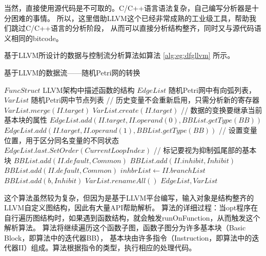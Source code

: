 当然，直接使用源代码是不可取的。C/C++语言语法复杂，自己编写分析器是十分困难的事情。
所以，这里借助LLVM这个已经非常成熟的工业级工具，帮助我们跳过C/C++语言的分析阶段，
从而可以直接分析结构整齐，同时又与源代码语义相同的bitcode。

基于LLVM所设计的数据与控制流分析算法如算法 \ref{alg:eg:dfgllvm} 所示。

\begin{algorithm}[!hbt]
\caption{基于LLVM的数据流——随机Petri网的转换} \label{alg:eg:dfgllvm}
\begin{algorithmic}[1] %
  \Require $FuncStruct$ LLVM架构中描述函数的结构
  \Ensure $EdgeList$ 随机Petri网中有向弧列表，$VarList$ 随机Petri网中节点列表
              \State // 历史变量不会重新启用，只需分析新的寄存器
              \State $VarList.merge(II.target)$
            \Else
              \State $VarList.create(II.target)$
            \EndIf
            \State // 数据的变换要继承当前基本块的属性
            \State $EdgeList.add(II.target, II.operand(0), BBList.getType(BB))$
            \State $EdgeList.add(II.target, II.operand(1), BBList.getType(BB))$
            \State // 设置变量位置，用于区分同名变量的不同状态
            \State $EdgeList.last.SetOrder(CurrentLoopIndex)$
            \State // 标记要视为抑制弧尾部的基本块
            \State $BBList.add(II.default, Common)$
            \State $BBList.add(II.inhibit, Inhibit)$
            \State $BBList.add(II.default, Common)$
            \State $inhbrList \gets II.branchList$
              \State $BBList.add(b, Inhibit)$
            \EndFor
          \EndIf
        \EndFor
      \EndFor
      \State $VarList.renameAll()$
      \State \Return $EdgeList, VarList$
    \EndFunction
      \State \Return {}
    \EndFunction
\end{algorithmic}
\end{algorithm}

这个算法虽然较为复杂，但因为是基于LLVM平台编写，输入对象是结构整齐的LLVM自定义图结构，因此有大量API帮助解析。
算法的详细过程：当opt程序在自行遍历图结构时，如果遇到函数结构，就会触发runOnFunction，从而触发这个解析算法。
算法将继续遍历这个函数子图，函数子图分为许多基本块（Basic Block，即算法中的迭代器BB），
基本块由许多指令（Instruction，即算法中的迭代器II）组成。算法根据指令的类型，执行相应的处理代码。

